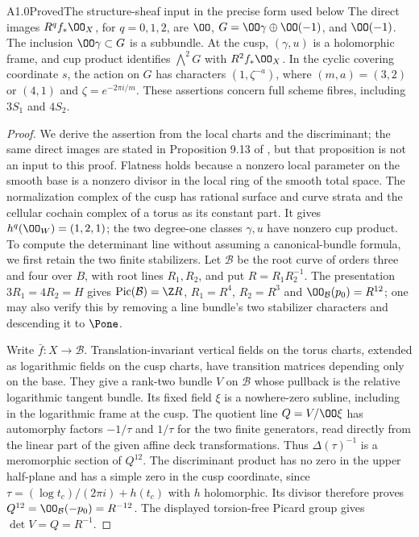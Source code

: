 \begin{claim}{A1.0}{Proved}{The structure-sheaf input in the precise form used below}
The direct images $R^qf_*\OO_X$, for $q=0,1,2$, are
$\OO$, $G=\OO\gamma\oplus\OO(-1)$, and $\OO(-1)$.
The inclusion $\OO\gamma\subset G$ is a subbundle.  At the cusp,
$(\gamma,u)$ is a holomorphic frame, and cup product identifies
$\bigwedge^2G$ with $R^2f_*\OO_X$.  In the cyclic covering coordinate
$s$, the action on $G$ has characters $(1,\zeta^{-a})$, where
$(m,a)=(3,2)$ or $(4,1)$ and $\zeta=e^{-2\pi i/m}$.
These assertions concern full scheme fibres, including $3S_1$ and $4S_2$.
\end{claim}
\begin{proof}
We derive the assertion from the local charts and the discriminant;
the same direct images are stated in Proposition 9.13 of
\citet{AC2026}, but that proposition is not an input to this proof.
Flatness holds
because a nonzero local parameter on the smooth base is a nonzero divisor
in the local ring of the smooth total space.  The normalization complex
of the cusp has rational surface and curve strata and the cellular
cochain complex of a torus as its constant part.  It gives
$h^q(\OO_W)=(1,2,1)$; the two degree-one classes $\gamma,u$ have nonzero
cup product.  To compute the determinant line without assuming a
canonical-bundle formula, we first retain the two finite stabilizers.
Let $\mathcal B$ be the root curve of orders three and four over $B$,
with root lines $R_1,R_2$, and put $R=R_1R_2^{-1}$.  The presentation
$3R_1=4R_2=H$ gives $\operatorname{Pic}(\mathcal B)=\Z R$,
$R_1=R^4$, $R_2=R^3$ and $\OO_{\mathcal B}(p_0)=R^{12}$;
one may also verify this by removing a line bundle's two stabilizer
characters and descending it to $\Pone$.

Write $\bar f:X\to\mathcal B$.  Translation-invariant vertical
fields on the torus charts, extended as logarithmic fields on the cusp
charts, have transition matrices depending only on the base.  They
give a rank-two bundle $V$ on $\mathcal B$ whose pullback is the
relative logarithmic tangent bundle.  Its fixed field $\xi$ is a
nowhere-zero subline, including in the logarithmic frame at the cusp.
The quotient line $Q=V/\OO\xi$ has automorphy factors $-1/\tau$
and $1/\tau$ for the two finite generators, read directly from the
linear part of the given affine deck transformations.  Thus
$\Delta(\tau)^{-1}$ is a meromorphic section of $Q^{12}$.
The discriminant product has no zero in the upper half-plane and
has a simple zero in the cusp coordinate, since
$\tau=(\log t_c)/(2\pi i)+h(t_c)$ with $h$ holomorphic.  Its divisor
therefore proves $Q^{12}=\OO_{\mathcal B}(-p_0)=R^{-12}$.
The displayed torsion-free Picard group gives
$\det V=Q=R^{-1}$.


\end{proof}
